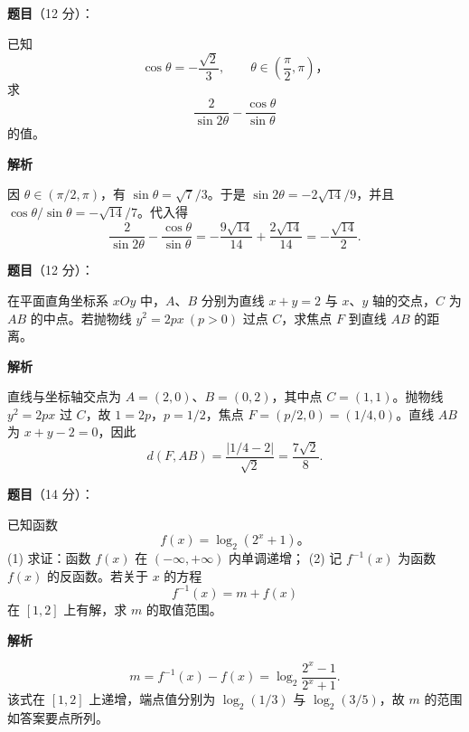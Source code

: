 \begin{answer}

\textbf{题目}（12 分）：

已知
\nopagebreak[4]
\[
\cos\theta=-\frac{\sqrt2}{3},\qquad \theta\in\left(\frac\pi2,\pi\right)\text{，}
\]
求
\nopagebreak[4]
\[
\frac2{\sin 2\theta}-\frac{\cos\theta}{\sin\theta}
\]
的值。

\textbf{解析}

因 $\theta\in(\pi/2,\pi)$，有 $\sin\theta=\sqrt7/3$。于是 $\sin2\theta=-2\sqrt{14}/9$，并且 $\cos\theta/\sin\theta=-\sqrt{14}/7$。代入得
\nopagebreak[4]
\[
\frac2{\sin2\theta}-\frac{\cos\theta}{\sin\theta}
=-\frac{9\sqrt{14}}{14}+\frac{2\sqrt{14}}{14}
=-\frac{\sqrt{14}}2.
\]


\end{answer}
\begin{answer}

\textbf{题目}（12 分）：

在平面直角坐标系 \(xOy\) 中，\(A\text{、}B\) 分别为直线 \(x+y=2\) 与 \(x\text{、}y\) 轴的交点，\(C\) 为 \(AB\) 的中点。若抛物线 \(y^2=2px\ (p>0)\) 过点 \(C\)，求焦点 \(F\) 到直线 \(AB\) 的距离。

\textbf{解析}

直线与坐标轴交点为 $A=(2,0)$、$B=(0,2)$，其中点 $C=(1,1)$。抛物线 $y^2=2px$ 过 $C$，故 $1=2p$，$p=1/2$，焦点 $F=(p/2,0)=(1/4,0)$。直线 $AB$ 为 $x+y-2=0$，因此
\nopagebreak[4]
\[
d(F,AB)=\frac{|1/4-2|}{\sqrt2}=\frac{7\sqrt2}{8}.
\]


\end{answer}
\begin{answer}

\textbf{题目}（14 分）：

已知函数
\nopagebreak[4]
\[
f(x)=\log_2(2^x+1)\text{。}
\]
(1) 求证：函数 \(f(x)\) 在 \((-\infty,+\infty)\) 内单调递增；
(2) 记 \(f^{-1}(x)\) 为函数 \(f(x)\) 的反函数。若关于 \(x\) 的方程
\nopagebreak[4]
   \[
   f^{-1}(x)=m+f(x)
   \]
   在 \([1,2]\) 上有解，求 \(m\) 的取值范围。

\textbf{解析}

\nopagebreak[4]
\[
m=f^{-1}(x)-f(x)=\log_2\frac{2^x-1}{2^x+1}.
\]
   该式在 $[1,2]$ 上递增，端点值分别为 $\log_2(1/3)$ 与 $\log_2(3/5)$，故 $m$ 的范围如答案要点所列。



\end{answer}
